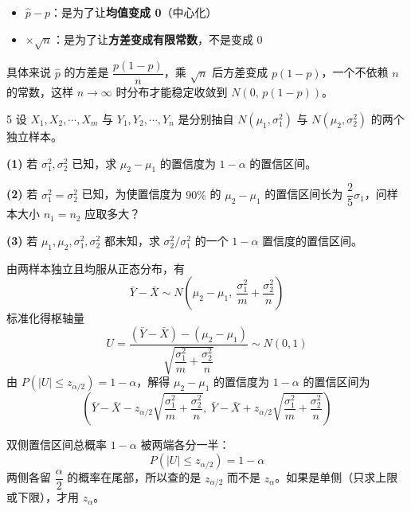 \begin{note}
\begin{itemize}
  \item $\hat{p} - p$：是为了让\textbf{均值变成 0}（中心化）
  \item $\times \sqrt{n}$：是为了让\textbf{方差变成有限常数}，不是变成 0
\end{itemize}
具体来说 $\hat{p}$ 的方差是 $\dfrac{p(1-p)}{n}$，乘 $\sqrt{n}$ 后方差变成 $p(1-p)$，一个不依赖 $n$ 的常数，这样 $n\to\infty$ 时分布才能稳定收敛到 $N(0,\,p(1-p))$。
\end{note}
\begin{homework}{5}
设 $X_1, X_2, \cdots, X_m$ 与 $Y_1, Y_2, \cdots, Y_n$ 是分别抽自 $N(\mu_1, \sigma_1^2)$ 与 $N(\mu_2, \sigma_2^2)$ 的两个独立样本。

\textbf{(1)} 若 $\sigma_1^2, \sigma_2^2$ 已知，求 $\mu_2 - \mu_1$ 的置信度为 $1-\alpha$ 的置信区间。

\textbf{(2)} 若 $\sigma_1^2 = \sigma_2^2$ 已知，为使置信度为 $90\%$ 的 $\mu_2 - \mu_1$ 的置信区间长为 $\dfrac{2}{5}\sigma_1$，问样本大小 $n_1 = n_2$ 应取多大？

\textbf{(3)} 若 $\mu_1, \mu_2, \sigma_1^2, \sigma_2^2$ 都未知，求 $\sigma_2^2/\sigma_1^2$ 的一个 $1-\alpha$ 置信度的置信区间。
\end{homework}
\begin{solution}
由两样本独立且均服从正态分布，有
$$\bar{Y} - \bar{X} \sim N\!\left(\mu_2-\mu_1,\ \frac{\sigma_1^2}{m}+\frac{\sigma_2^2}{n}\right)$$
标准化得枢轴量
$$U = \frac{(\bar{Y}-\bar{X})-(\mu_2-\mu_1)}{\sqrt{\dfrac{\sigma_1^2}{m}+\dfrac{\sigma_2^2}{n}}} \sim N(0,1)$$
由 $P(|U| \leq z_{\alpha/2}) = 1-\alpha$，解得 $\mu_2-\mu_1$ 的置信度为 $1-\alpha$ 的置信区间为
$$\left(\bar{Y}-\bar{X}-z_{\alpha/2}\sqrt{\frac{\sigma_1^2}{m}+\frac{\sigma_2^2}{n}},\ \bar{Y}-\bar{X}+z_{\alpha/2}\sqrt{\frac{\sigma_1^2}{m}+\frac{\sigma_2^2}{n}}\right)$$
\end{solution}
\begin{note}
双侧置信区间总概率 $1-\alpha$ 被两端各分一半：
$$P(|U| \leq z_{\alpha/2}) = 1-\alpha$$
两侧各留 $\dfrac{\alpha}{2}$ 的概率在尾部，所以查的是 $z_{\alpha/2}$ 而不是 $z_\alpha$。如果是单侧（只求上限或下限），才用 $z_\alpha$。
\end{note}
